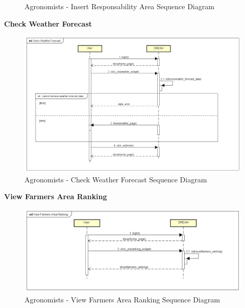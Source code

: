 \documentclass[table, 12pt]{article}
\begin{document}
\begin{itemize}
\begin{center}
\begin{figure}[H]
                    \caption{Agronomists - Insert Responsability Area Sequence Diagram}
                    \label{fig: sdAgronomist_insertResponsibilityArea}
                \end{figure}
            \end{center}
            \newpage
            \textbf{Check Weather Forecast}\\
            \begin{center}
                \begin{figure}[H]
                    \includegraphics[scale=0.55, center]{assets/Sequence diagrams/Agronomist/Check Weather Forecast.png}
                    \caption{Agronomists - Check Weather Forecast Sequence Diagram}
                    \label{fig: sdAgronomist_checkWeatherForecast}
                \end{figure}
            \end{center}
            \newpage
            \textbf{View Farmers Area Ranking}\\
            \begin{center}
                \begin{figure}[H]
                    \includegraphics[scale=0.60, center]{assets/Sequence diagrams/Agronomist/View Farmers Area Ranking.png}
                    \caption{Agronomists - View Farmers Area Ranking Sequence Diagram}
                    \label{fig: sdAgronomist_viewFarmersAreaRanking}
                \end{figure}
            \end{center}
        \end{itemize}
        \newpage
\end{document}
